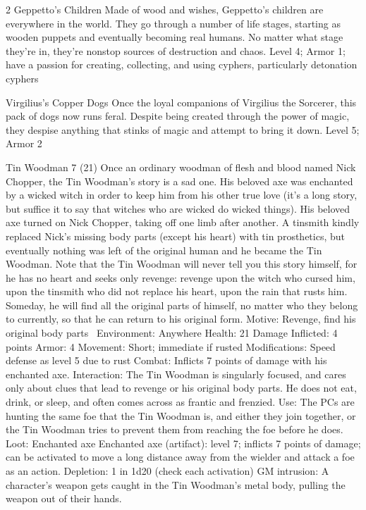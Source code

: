 \begin{multicols}{2}
Geppetto’s Children
Made of wood and wishes, Geppetto’s children are everywhere in the world. They go through a number of life stages, starting as wooden puppets and eventually becoming real humans. No matter what stage they’re in, they’re nonstop sources of destruction and chaos.
Level 4; Armor 1; have a passion for creating, collecting, and using cyphers, particularly detonation cyphers

Virgilius’s Copper Dogs
Once the loyal companions of Virgilius the Sorcerer, this pack of dogs now runs feral. Despite being created through the power of magic, they despise anything that stinks of magic and attempt to bring it down.
Level 5; Armor 2

Tin Woodman 7 (21)
Once an ordinary woodman of flesh and blood named Nick Chopper, the Tin Woodman’s story is a sad one. His beloved axe was enchanted by a wicked witch in order to keep him from his other true love (it’s a long story, but suffice it to say that witches who are wicked do wicked things). His beloved axe turned on Nick Chopper, taking off one limb after another. A tinsmith kindly replaced Nick’s missing body parts (except his heart) with tin prosthetics, but eventually nothing was left of the original human and he became the Tin Woodman.
Note that the Tin Woodman will never tell you this story himself, for he has no heart and seeks only revenge: revenge upon the witch who cursed him, upon the tinsmith who did not replace his heart, upon the rain that rusts him. Someday, he will find all the original parts of himself, no matter who they belong to currently, so that he can return to his original form.
Motive: Revenge, find his original body parts 
Environment: Anywhere
Health: 21
Damage Inflicted: 4 points
Armor: 4
Movement: Short; immediate if rusted Modifications: Speed defense as level 5 due to rust
Combat: Inflicts 7 points of damage with his enchanted axe.
Interaction: The Tin Woodman is singularly focused, and cares only about clues that lead to revenge or his original body parts. He does not eat, drink, or sleep, and often comes across as frantic and frenzied.
Use: The PCs are hunting the same foe that the Tin Woodman is, and either they join together, or the Tin Woodman tries to prevent them from reaching the foe before he does.
Loot: Enchanted axe
Enchanted axe (artifact): level 7; inflicts 7 points of damage; can be activated to move a long distance away from the wielder and attack a foe as an action. Depletion: 1 in 1d20 (check each activation)
GM intrusion: A character’s weapon gets caught in the Tin Woodman’s metal body, pulling the weapon out of their hands. 


\end{multicols}

